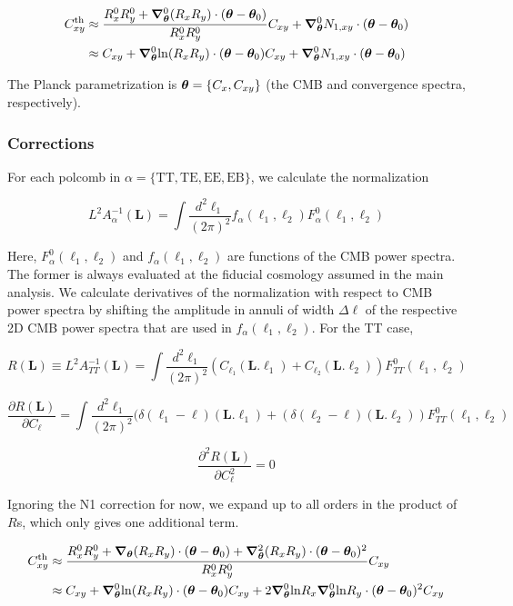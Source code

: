 \documentclass[a4paper, 11pt]{article}
\begin{document}
\begin{align*}
C_{xy}^{\mathrm{th}}&\approx\frac{R^0_xR^0_y+\boldsymbol{\nabla}^0_{\boldsymbol{\theta}} (R_xR_y)\cdot (\boldsymbol{\theta}-\boldsymbol{\theta}_0)}{R^0_xR^0_y}C_{xy} + \boldsymbol{\nabla}^0_{\boldsymbol{\theta}} N_{1,xy}\cdot (\boldsymbol{\theta}-\boldsymbol{\theta}_0) \\
&\approx C_{xy}+\boldsymbol{\nabla}^0_{\boldsymbol{\theta}} \mathrm{ln}(R_xR_y)\cdot (\boldsymbol{\theta}-\boldsymbol{\theta}_0)C_{xy} + \boldsymbol{\nabla}^0_{\boldsymbol{\theta}} N_{1,xy}\cdot (\boldsymbol{\theta}-\boldsymbol{\theta}_0)
\end{align*}

The Planck parametrization is $\boldsymbol{\theta}=\{C_x, C_{xy}\}$ (the CMB and convergence spectra, respectively).

\subsubsection{Corrections}

\newcommand{\bell}{\boldsymbol{\ell}}
\newcommand{\bL}{\boldsymbol{L}}

For each polcomb in $\alpha=\{\mathrm{TT,TE,EE,EB}\}$, we calculate the normalization

$$
L^2A_{\alpha}^{-1}(\bL) = \int \frac{d^2\bell_1}{(2\pi)^2} f_{\alpha}(\bell_1,\bell_2)F_{\alpha}^0(\bell_1,\bell_2)
$$

Here, $F_{\alpha}^0(\bell_1,\bell_2)$ and $f_{\alpha}(\bell_1,\bell_2)$ are functions of the CMB power spectra. The former is always evaluated at the fiducial cosmology assumed in the main analysis. We calculate derivatives of the normalization with respect to CMB power spectra by shifting the amplitude in annuli of width $\Delta \ell$ of the respective 2D CMB power spectra that are used in $f_{\alpha}(\bell_1,\bell_2)$. For the TT case,

$$
R(\bL) \equiv L^2A_{TT}^{-1}(\bL) = \int \frac{d^2\bell_1}{(2\pi)^2} (C_{\ell_1}(\bL.\bell_1)+C_{\ell_2}(\bL.\bell_2))F_{TT}^0(\bell_1,\bell_2)
$$

$$
\frac{\partial R(\bL)}{\partial C_{\ell}} = \int \frac{d^2\bell_1}{(2\pi)^2} (\delta(\ell_1-\ell)(\bL.\bell_1)+(\delta(\ell_2-\ell)(\bL.\bell_2))F_{TT}^0(\bell_1,\bell_2)
$$

$$
\frac{\partial^2 R(\bL)}{\partial C^2_{\ell}} = 0
$$

Ignoring the N1 correction for now, we expand up to all orders in the product of $R$s, which only gives one additional term.

\begin{align*}
C_{xy}^{\mathrm{th}}&\approx\frac{R^0_xR^0_y+\boldsymbol{\nabla}_{\boldsymbol{\theta}} (R_xR_y)\cdot (\boldsymbol{\theta}-\boldsymbol{\theta}_0)+\boldsymbol{\nabla}^2_{\boldsymbol{\theta}} (R_xR_y)\cdot (\boldsymbol{\theta}-\boldsymbol{\theta}_0)^2}{R^0_xR^0_y}C_{xy}  \\
&\approx C_{xy}+\boldsymbol{\nabla}^0_{\boldsymbol{\theta}} \mathrm{ln}(R_xR_y)\cdot (\boldsymbol{\theta}-\boldsymbol{\theta}_0)C_{xy} +2\boldsymbol{\nabla}^0_{\boldsymbol{\theta}} \mathrm{ln}R_x\boldsymbol{\nabla}^0_{\boldsymbol{\theta}}\mathrm{ln}R_y\cdot (\boldsymbol{\theta}-\boldsymbol{\theta}_0)^2C_{xy} 
\end{align*}
\end{document}
